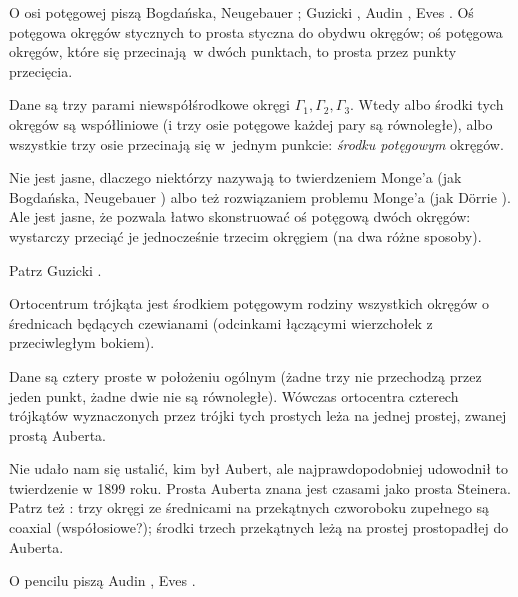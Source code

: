O osi potęgowej piszą Bogdańska, Neugebauer \cite[s. 69]{neugebauer_2018}; Guzicki \cite[s. 173, 174]{guzicki_2021}, Audin \cite[s. 89]{audin_2003}, Eves \cite[s. 92]{eves1_1972}.
Oś potęgowa okręgów stycznych to prosta styczna do obydwu okręgów; oś potęgowa okręgów, które się przecinają w dwóch punktach, to prosta przez punkty przecięcia.

\begin{proposition}
	Dane są trzy parami niewspółśrodkowe okręgi $\Gamma_1, \Gamma_2, \Gamma_3$.
	Wtedy albo środki tych okręgów są współliniowe (i trzy osie potęgowe każdej pary są równoległe), albo wszystkie trzy osie przecinają się w~jednym punkcie: \emph{środku potęgowym} okręgów.
\end{proposition}

Nie jest jasne, dlaczego niektórzy nazywają to twierdzeniem Monge'a (jak Bogdańska, Neugebauer \cite[s. ???]{neugebauer_2018}) albo też rozwiązaniem problemu Monge'a (jak Dörrie \cite[s. 151]{dorrie_1965}).
%
Ale jest jasne, że pozwala łatwo skonstruować oś potęgową dwóch okręgów: wystarczy przeciąć je jednocześnie trzecim okręgiem (na dwa różne sposoby).

Patrz Guzicki \cite[s. 174]{guzicki_2021}.

\begin{proposition}
	Ortocentrum trójkąta jest środkiem potęgowym rodziny wszystkich okręgów o średnicach będących czewianami (odcinkami łączącymi wierzchołek z przeciwległym bokiem).
\end{proposition}

\begin{theorem}[Auberta]
	Dane są cztery proste w położeniu ogólnym (żadne trzy nie przechodzą przez jeden punkt, żadne dwie nie są równoległe).
	Wówczas ortocentra czterech trójkątów wyznaczonych przez trójki tych prostych leża na jednej prostej, zwanej prostą Auberta.
\end{theorem}

Nie udało nam się ustalić, kim był Aubert, ale najprawdopodobniej udowodnił to twierdzenie w 1899 roku.
Prosta Auberta znana jest czasami jako prosta Steinera.
Patrz też \cite[s. 95]{eves1_1972}: trzy okręgi ze średnicami na przekątnych czworoboku zupełnego są coaxial (współosiowe?); środki trzech przekątnych leżą na prostej prostopadłej do Auberta.

O pencilu piszą Audin \cite[s. 92-98]{audin_2003}, Eves \cite[s. 94]{eves1_1972}.